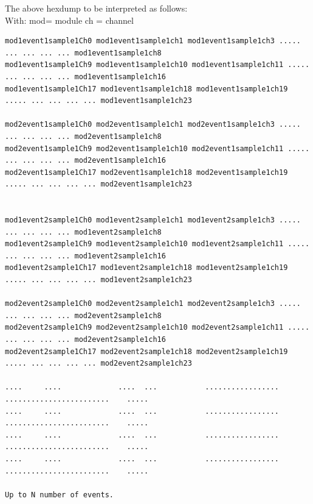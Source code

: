 \documentclass[12pt]{article}
\begin{document}
The above hexdump to be interpreted as follows:\\
With: mod= module  ch = channel\\
\begingroup
    \fontsize{8pt}{12pt}\selectfont
    \begin{verbatim}      
mod1event1sample1Ch0 mod1event1sample1ch1 mod1event1sample1ch3 ..... ... ... ... ... mod1event1sample1ch8 
mod1event1sample1Ch9 mod1event1sample1ch10 mod1event1sample1ch11 ..... ... ... ... ... mod1event1sample1ch16
mod1event1sample1Ch17 mod1event1sample1ch18 mod1event1sample1ch19 ..... ... ... ... ... mod1event1sample1ch23

mod2event1sample1Ch0 mod2event1sample1ch1 mod2event1sample1ch3 ..... ... ... ... ... mod2event1sample1ch8 
mod2event1sample1Ch9 mod2event1sample1ch10 mod2event1sample1ch11 ..... ... ... ... ... mod2event1sample1ch16
mod2event1sample1Ch17 mod2event1sample1ch18 mod2event1sample1ch19 ..... ... ... ... ... mod2event1sample1ch23


mod1event2sample1Ch0 mod1event2sample1ch1 mod1event2sample1ch3 ..... ... ... ... ... mod1event2sample1ch8 
mod1event2sample1Ch9 mod1event2sample1ch10 mod1event2sample1ch11 ..... ... ... ... ... mod1event2sample1ch16
mod1event2sample1Ch17 mod1event2sample1ch18 mod1event2sample1ch19 ..... ... ... ... ... mod1event2sample1ch23

mod2event2sample1Ch0 mod2event2sample1ch1 mod2event2sample1ch3 ..... ... ... ... ... mod2event2sample1ch8
mod2event2sample1Ch9 mod2event2sample1ch10 mod2event2sample1ch11 ..... ... ... ... ... mod2event2sample1ch16
mod2event2sample1Ch17 mod2event2sample1ch18 mod2event2sample1ch19 ..... ... ... ... ... mod2event2sample1ch23
  
....     ....             ....  ...           .................             ........................    .....
....     ....             ....  ...           .................             ........................    .....
....     ....             ....  ...           .................             ........................    .....
....     ....             ....  ...           .................             ........................    .....

Up to N number of events.

\end{verbatim}    
\endgroup
\end{document}
